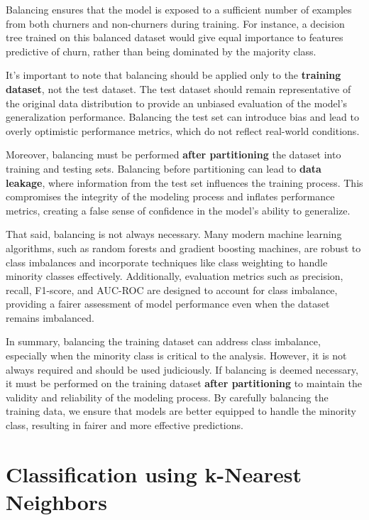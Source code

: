 \documentclass[
]{book}
\theoremstyle{definition}
\theoremstyle{definition}
\theoremstyle{definition}
\theoremstyle{definition}
\theoremstyle{remark}
\begin{document}
Balancing ensures that the model is exposed to a sufficient number of examples from both churners and non-churners during training. For instance, a decision tree trained on this balanced dataset would give equal importance to features predictive of churn, rather than being dominated by the majority class.

It's important to note that balancing should be applied only to the \textbf{training dataset}, not the test dataset. The test dataset should remain representative of the original data distribution to provide an unbiased evaluation of the model's generalization performance. Balancing the test set can introduce bias and lead to overly optimistic performance metrics, which do not reflect real-world conditions.

Moreover, balancing must be performed \textbf{after partitioning} the dataset into training and testing sets. Balancing before partitioning can lead to \textbf{data leakage}, where information from the test set influences the training process. This compromises the integrity of the modeling process and inflates performance metrics, creating a false sense of confidence in the model's ability to generalize.

That said, balancing is not always necessary. Many modern machine learning algorithms, such as random forests and gradient boosting machines, are robust to class imbalances and incorporate techniques like class weighting to handle minority classes effectively. Additionally, evaluation metrics such as precision, recall, F1-score, and AUC-ROC are designed to account for class imbalance, providing a fairer assessment of model performance even when the dataset remains imbalanced.

In summary, balancing the training dataset can address class imbalance, especially when the minority class is critical to the analysis. However, it is not always required and should be used judiciously. If balancing is deemed necessary, it must be performed on the training dataset \textbf{after partitioning} to maintain the validity and reliability of the modeling process. By carefully balancing the training data, we ensure that models are better equipped to handle the minority class, resulting in fairer and more effective predictions.

\chapter{Classification using k-Nearest Neighbors}\label{chapter-knn}
\end{document}
